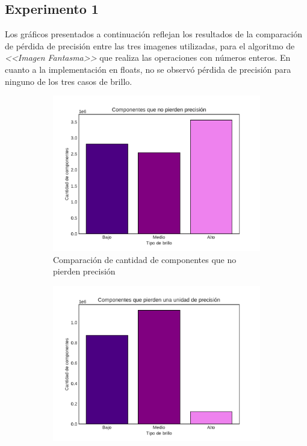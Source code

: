 \documentclass[a4paper]{article}
\begin{document}
\subsection{Experimento 1}

\justify
Los gráficos presentados a continuación reflejan los resultados de la comparación de pérdida de precisión entre las tres imagenes utilizadas, para el algoritmo de \textit{<<Imagen Fantasma>>} que realiza las operaciones con números enteros. En cuanto a la implementación en floats, no se observó pérdida de precisión para ninguno de los tres casos de brillo.
 
\begin{figure}[h]
	\centering
	\begin{subfigure}{0.49 \textwidth}
		\includegraphics[width=\textwidth]{img/Precision0.pdf}
		\caption{Comparación de cantidad de componentes que no pierden precisión}
	\end{subfigure}
	\hfill
	\begin{subfigure}{0.49 \textwidth}
		\includegraphics[width=\textwidth]{img/Precision1.pdf}

\end{subfigure}
\end{figure}
\end{document}
